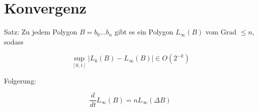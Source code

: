 \documentclass[8pt, DIV15, twocolumn]{scrartcl}
\begin{document}
\section*{Konvergenz}
Satz: Zu jedem Polygon $B = b_0 ... b_n$ gibt es ein Polygon $L_\infty \left( B \right)$ vom Grad $\leq n$, sodass

\begin{equation*}
\sup\limits_{[0,1]} |L_k \left( B \right) - L_\infty \left( B \right)| \in O \left( 2^{-k} \right)
\end{equation*}

Folgerung:

\begin{equation*}
\frac{d}{dt} L_\infty \left( B \right) = n L_\infty \left( \Delta B \right)
\end{equation*}
\end{document}
